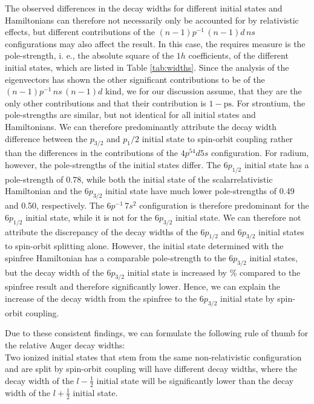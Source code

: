 The observed differences in the decay widths for different initial states and
Hamiltonians can therefore not necessarily only be accounted for by relativistic
effects, but different contributions of the $(n-1)p^{-1} \,(n-1)d \, ns$
configurations may also affect the result.
In this case, the requires measure is the pole-strength, i. e.,
the absolute square of the $1h$ coefficients,
of the different initial states, which are listed in Table \ref{tab:widths}.
Since the analysis of the eigenvectors has shown the other significant contributions
to be of the $(n-1)p^{-1} \,ns \, (n-1)d$ kind, we for our discussion assume, that
they are the only other contributions and that their contribution is $1-\text{ps}$.
For strontium, the pole-strengths are similar, but not identical for all initial
states and Hamiltonians. 
We can therefore predominantly attribute the decay width difference between the
$p_{3/2}$ and $p_1/2$ initial state to spin-orbit coupling rather than the
differences in the contributions of the $4p^54d5s$ configuration.
For radium, however, the pole-strengths of the initial states differ.
The $6p_{1/2}$ initial state has a pole-strength of 0.78, while both the
initial state of the scalarrelativistic Hamiltonian and the $6p_{3/2}$ initial
state have much lower pole-strengths of 0.49 and 0.50, respectively.
The $6p^{-1} \,7s^2$ configuration is therefore predominant for the $6p_{1/2}$
initial state, while it is not for the $6p_{3/2}$ initial state.
We can therefore not attribute the discrepancy of the decay widths of the
$6p_{1/2}$ and $6p_{3/2}$ initial states to spin-orbit splitting alone.
However, the initial state determined with the spinfree
Hamiltonian has a comparable pole-strength to the $6p_{3/2}$ initial states,
but the decay width of the $6p_{3/2}$ initial state is increased by \unit[236]{\%}
compared to the spinfree result and therefore
significantly lower.
Hence, we can explain the increase of the decay width from the spinfree to the
$6p_{3/2}$ initial state by spin-orbit coupling.

Due to these consistent findings, we can formulate the following rule of thumb for
the relative Auger decay widths:\\
Two ionized initial states that stem from the same non-relativistic configuration and
are split by spin-orbit coupling will have different decay widths, where the decay width
of the $l-\frac12$ initial state will be significantly lower than the decay width of
the $l + \frac12$ initial state.



